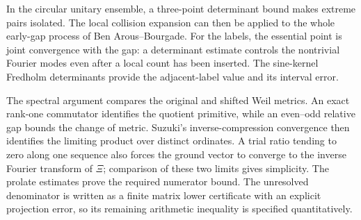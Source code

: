 \documentclass[11pt,a4paper]{article}
\theoremstyle{definition}
\theoremstyle{remark}
\begin{document}
In the circular unitary ensemble, a three-point determinant bound
makes extreme pairs isolated. The local collision expansion can then
be applied to the whole early-gap process of Ben Arous--Bourgade.
For the labels, the essential point is joint convergence with the gap:
a determinant estimate controls the nontrivial Fourier modes even
after a local count has been inserted. The sine-kernel Fredholm
determinants provide the adjacent-label value and its interval error.

The spectral argument compares the original and shifted Weil metrics.
An exact rank-one commutator identifies the quotient primitive, while
an even--odd relative gap bounds the change of metric. Suzuki's
inverse-compression convergence then identifies the limiting product
over distinct ordinates. A trial ratio tending to zero along one
sequence also forces the ground vector to converge to the inverse
Fourier transform of $\Xi$; comparison of these two limits gives
simplicity. The prolate estimates prove the required numerator bound.
The unresolved denominator is written as a finite matrix lower
certificate with an explicit projection error, so its remaining
arithmetic inequality is specified quantitatively.










































\end{document}
